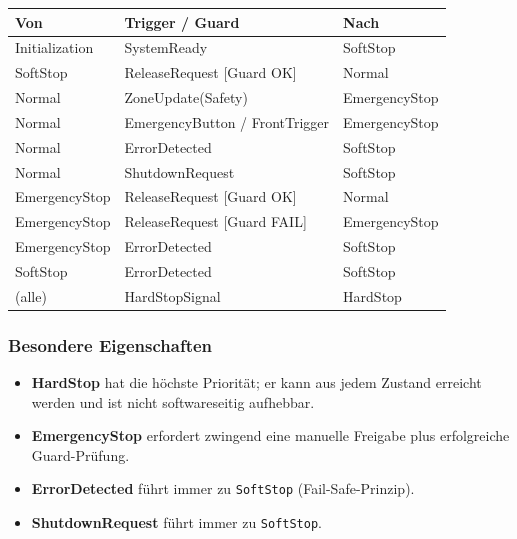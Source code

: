 \begin{center}
\renewcommand{\arraystretch}{1.3}
\begin{tabular}{>{\ttfamily}p{3.5cm} p{4cm} >{\ttfamily}p{3.5cm}}
  \toprule
  \normalfont\textbf{Von} & \normalfont\textbf{Trigger / Guard} & \normalfont\textbf{Nach} \\
  \midrule
  Initialization    & SystemReady                          & SoftStop \\
  SoftStop          & ReleaseRequest [Guard OK]            & Normal \\
  Normal            & ZoneUpdate(Safety)                   & EmergencyStop \\
  Normal            & EmergencyButton / FrontTrigger       & EmergencyStop \\
  Normal            & ErrorDetected                        & SoftStop \\
  Normal            & ShutdownRequest                      & SoftStop \\
  EmergencyStop     & ReleaseRequest [Guard OK]            & Normal \\
  EmergencyStop     & ReleaseRequest [Guard FAIL]          & EmergencyStop \\
  EmergencyStop     & ErrorDetected                        & SoftStop \\
  SoftStop          & ErrorDetected                        & SoftStop \\
  * (alle)          & HardStopSignal                       & HardStop \\
  \bottomrule
\end{tabular}
\end{center}

\subsubsection{Besondere Eigenschaften}

\begin{itemize}
  \item \textbf{HardStop} hat die höchste Priorität; er kann aus jedem Zustand
        erreicht werden und ist nicht softwareseitig aufhebbar.
  \item \textbf{EmergencyStop} erfordert zwingend eine manuelle Freigabe plus
        erfolgreiche Guard-Prüfung.
  \item \textbf{ErrorDetected} führt immer zu \texttt{SoftStop}
        (Fail-Safe-Prinzip).
  \item \textbf{ShutdownRequest} führt immer zu \texttt{SoftStop}.
\end{itemize}

